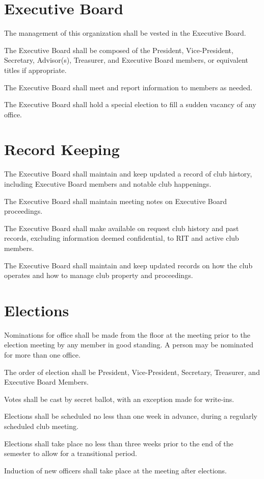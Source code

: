 \documentclass[a4paper]{article}
\begin{document}
\section{Executive Board}
\begin{subroutines}
\item The management of this organization shall be vested in the Executive Board.
\item The Executive Board shall be composed of the President, Vice-President, Secretary, Advisor(s), Treasurer, and Executive Board members, or equivalent titles if appropriate.
\item The Executive Board shall meet and report information to members as needed.
\item The Executive Board shall hold a special election to fill a sudden vacancy of any office.
\end{subroutines}

\section{Record Keeping}
\begin{subroutines}
\item The Executive Board shall maintain and keep updated a record of club history, including Executive Board members and notable club happenings.
\item The Executive Board shall maintain meeting notes on Executive Board proceedings.
\item The Executive Board shall make available on request club history and past records, excluding information deemed confidential, to RIT and active club members.
\item The Executive Board shall maintain and keep updated records on how the club operates and how to manage club property and proceedings.
\end{subroutines}

\section{Elections}
\begin{subroutines}
\item Nominations for office shall be made from the floor at the meeting prior to the election meeting by any member in good standing. A person may be nominated for more than one office.
\item The order of election shall be President, Vice-President, Secretary, Treasurer, and Executive Board Members.
\item Votes shall be cast by secret ballot, with an exception made for write-ins.
\item Elections shall be scheduled no less than one week in advance, during a regularly scheduled club meeting.
\item Elections shall take place no less than three weeks prior to the end of the semester to allow for a transitional period.
\item Induction of new officers shall take place at the meeting after elections.
\end{subroutines}
\end{document}
